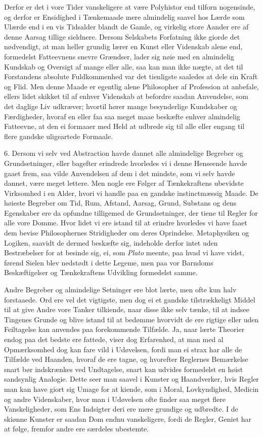 \documentclass[12pt,a4paper]{article}
\newcommand{\opage}[1]{\marginnote{\footnotesize\textit{[#1]}}}
\begin{document}
Derfor er det i vore Tider vanskeligere at være Polyhistor end tilforn nogensinde, og
derfor er Ensidighed i Tænkemaade mere almindelig saavel hos Lærde som Ulærde end i en vis
Tidsalder blandt de Gamle, og virkelig store Aander ere af denne Aarsag tillige sieldnere.
Dersom Selskabets Forfatning ikke giorde det nødvendigt, at man heller grundig lærer en
Kunst eller Videnskab alene end, formedelst Fatteevnens snevre Grændser, lader sig nøie
med en almindelig Kundskab og Oversigt af mange eller alle, saa kan man ikke nægte, at det
til Forstandens absolute Fuldkommenhed var det tienligste saaledes at dele sin Kraft og
Flid. Men denne Maade er egentlig alene Philosopher af Profession at anbefale, ellers
lidet skikket til af enhver Videnskab at befordre saadan Anvendelse, som det daglige Liv
udkræver; hvortil hører mange besynderlige Kundskaber og Færdigheder, hvoraf en eller faa
saa meget maae beskæfte enhver almindelig Fatteevne, at den ei formaaer med Held
\opage{160} at udbrede sig til alle eller engang til flere gandske uligeartede Formaale.

6. Dersom vi selv ved Abstraction havde dannet alle almindelige Begreber og
Grundsetninger, eller bagefter erindrede hvorledes vi i denne Henseende havde gaaet frem,
saa vilde Anvendelsen af dem i det mindste, som vi selv havde dannet, være meget lettere.
Men nogle ere Følger af Tænkekraftens ubevidste Virksomhed i en Alder, hvori vi handle paa
en gandske instinctmæssig Maade. De høieste Begreber om Tid, Rum, Afstand, Aarsag, Grund,
Substans og dens Egenskaber ere da opfundne tilligemed de Grundsetninger, der tiene til
Regler for alle vore Domme. Hvor lidet vi ere istand til at erindre hvorledes vi have faaet
dem bevise Philosophernes Stridigheder om deres Oprindelse. Metaphysiken og Logiken,
saavidt de dermed beskæfte sig, indeholde derfor intet uden Bestræbelser for at besinde
sig, ei, som \emph{Plato} meente, paa hvad vi have vidst, førend Sielen blev nedstødt i
dette Legeme, men paa vor Barndoms Beskæftigelser og Tænkekraftens Udvikling formedelst
samme.

Andre Begreber og almindelige Setninger ere blot lærte, men ofte kun halv forstaaede. Ord
ere vel det vigtigste, men dog ei et gandske tilstrækkeligt Middel til at give Andre vore
Tanker tilkiende, naar disse ikke selv tænke, til at indsee Tingenes Grunde og blive
istand til at bedømme hvorvidt de ere rigtige eller uden Feiltagelse
\opage{161} kan anvendes paa forekommende Tilfælde. Ja, naar lærte Theorier endog paa det bedste ere
fattede, viser dog Erfarenhed, at man med al Opmærksomhed dog kan fare vild i Udøvelsen,
fordi man ei strax har alle de Tilfælde ved Haanden, hvoraf de ere tagne, og hvorefter
Reglernes Bemærkelse snart bør indskrænkes ved Undtagelse, snart kan udvides formedelst en
høist sandsynlig Analogie. Dette seer man saavel i Kunster og Haandverker, hvis Regler man
kan have giort sig Umage for at kiende, som i Moral, Lovkyndighed, Medicin og andre
Videnskaber, hvor man i Udøvelsen ofte finder saa meget flere Vanskeligheder, som Ens
Indsigter deri ere mere grundige og udbredte. I de skiønne Kunster er saadan Dom endnu
vanskeligere, fordi de Regler, Geniet har at følge, fremfor andre ere særdeles ubestemte.
\end{document}
